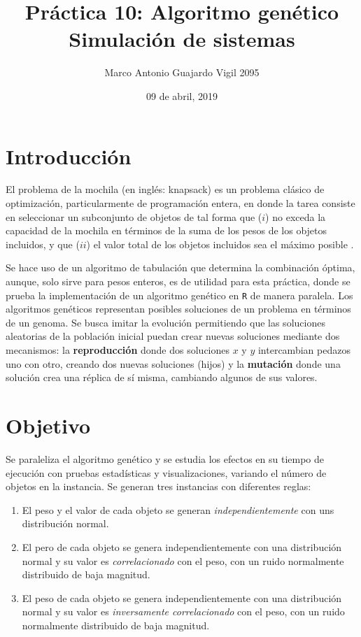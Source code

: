 \documentclass{article}
\author{Marco Antonio Guajardo Vigil  2095}
\title{\textbf{Pr\'actica 10: Algoritmo gen\'etico} \\ Simulaci\'on de sistemas}
\date{09 de abril, 2019}
\begin{document}
\maketitle

\section{Introducci\'on}
El problema de la mochila (en ingl\'es: knapsack) es un problema cl\'asico de optimizaci\'on, particularmente de programaci\'on entera, en donde la tarea consiste en seleccionar un subconjunto de objetos de tal forma que ($i$) no exceda la capacidad de la mochila en t\'erminos de la suma de los pesos de los objetos incluidos, y que ($ii$) el valor total de los objetos incluidos sea el m\'aximo posible \cite{SatuP10}.

Se hace uso de un algoritmo de tabulaci\'on que determina la combinaci\'on \'optima, aunque, solo sirve para pesos enteros, es de utilidad para esta pr\'actica, donde se prueba la implementaci\'on de un algoritmo gen\'etico en \texttt{R} de manera paralela. Los algoritmos gen\'eticos representan posibles soluciones de un problema en t\'erminos de un genoma. Se busca imitar la evoluci\'on permitiendo que las soluciones aleatorias de la poblaci\'on inicial puedan crear nuevas soluciones mediante dos mecanismos: la \textbf{reproducci\'on} donde dos soluciones $x$ y $y$ intercambian pedazos uno con otro, creando dos nuevas soluciones (hijos) y la \textbf{mutaci\'on} donde una soluci\'on crea una r\'eplica de s\'i misma, cambiando algunos de sus valores.

\section{Objetivo}

Se paraleliza el algoritmo gen\'etico y se estudia los efectos en su tiempo de ejecuci\'on con pruebas estad\'isticas y visualizaciones, variando el n\'umero de objetos en la instancia. Se generan tres instancias con diferentes reglas:

\begin{enumerate}
\item El peso y el valor de cada objeto se generan \textit{independientemente} con uns distribuci\'on normal.
\item El pero de cada objeto se genera independientemente con una distribuci\'on normal y su valor es \textit{correlacionado} con el peso, con un ruido normalmente distribuido de baja magnitud.
\item El peso de cada objeto se genera independientemente con una distribuci\'on normal y su valor es \textit{inversamente correlacionado} con el peso, con un ruido normalmente distribuido de baja magnitud.
\end{enumerate}
\end{document}
